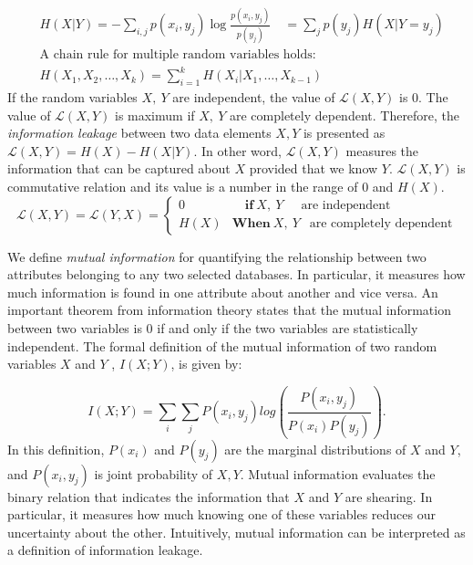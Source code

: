 \begin{equation}
\begin{aligned}
& H(X|Y) = -\sum_{i,j} p(x_i,y_j) \log \frac{p(x_i,y_j)}{p(y_j)} \quad =  \sum_j p(y_j) H(X|Y=y_j)\\
& \text{A chain rule for multiple random variables holds:}\\
& H(X_1,X_2,\ldots,X_k) = \sum_{i=1}^k H(X_i | X_1, \ldots, X_{k-1}) 
\end{aligned}
\end{equation}
If the random variables $X,~Y$ are independent, the value of $\mathcal{L}(X,Y)$ is $0$. The value of $\mathcal{L}(X,Y)$ is maximum if $X,~Y$ are completely dependent. Therefore, the {\it information leakage} between two data elements $X,Y$ is presented as $\mathcal{L} \left(X,Y\right)=H\left(X\right)-H\left(X \lvert Y\right)$. In other word, $\mathcal{L}(X,Y)$ measures the information that can be captured about $X$ provided that we know $Y$. $\mathcal{L}(X,Y)$ is commutative relation and its value is a number in the range of $0$ and $H\left(X\right)$. 
\begin{equation} 
\label{eq:leakage}
\mathcal{L} \left(X,Y\right)= \mathcal{L}\left(Y, X\right)= 
\begin{cases}
0   & \quad \textbf{if}  ~ X,~ Y ~~~~~ \text{ are independent}\\
H\left(X\right) & \textbf{When}  ~ X,~ Y~~   \text{ are completely dependent}
\end{cases}
\end{equation} 

 We define {\it mutual information } for quantifying the relationship between two attributes belonging to any two selected databases. In particular, it measures how much information is found in one attribute about another and vice versa. An important theorem from information theory states that the mutual information between two variables is 0 if and only if the two variables are statistically independent. The formal definition of the mutual information of two random variables $X$ and $Y$ , $I(X; Y)$, is given by: 

\begin{equation} 
I(X; Y ) = \sum_{i}\sum_{j} P\left(x_i, y_j\right) log \left(\frac{P\left(x_i, y_j\right)}{P\left(x_i\right)P\left(y_j\right)}\right).
\end{equation} 
In this definition, $P\left(x_i\right)$ and $P\left(y_j \right)$ are the marginal distributions of $X$ and $Y$, and $P\left(x_i, y_j \right)$ is joint probability of $X, Y$. Mutual information evaluates  the binary relation that indicates the information that $X$ and $Y$ are shearing. In particular, it measures how much knowing one of these variables reduces our uncertainty about the other. Intuitively, mutual information can be interpreted as a definition of information leakage.\\

